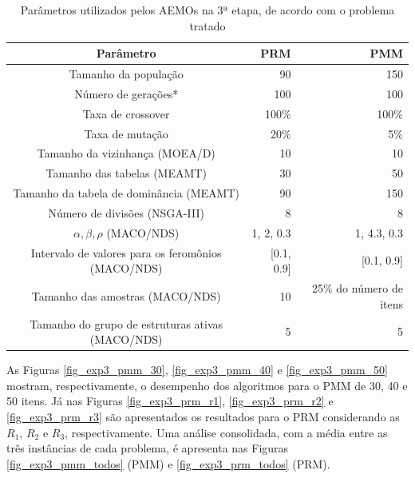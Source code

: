 \begin{table}[!htbp]
	\caption{Parâmetros utilizados pelos AEMOs na 3ª etapa, de acordo com o problema tratado}
	\label{table_exp3_parametros}
	\begin{center}
		\begin{tabular}{c|r|r}
			\textbf{Parâmetro} & \textbf{PRM} &  \textbf{PMM} \\ %
			\hline
			Tamanho da população               &    90 &      150 \\ %
			Número de gerações*        &   100 &      100 \\ %
			Taxa de crossover                & 100\% &    100\% \\ %
			Taxa de mutação                 &  20\% &      5\% \\ %
			Tamanho da vizinhança (MOEA/D)    &    10 &       10 \\ %
			Tamanho das tabelas (MEAMT)   &    30 &       50 \\ %
			Tamanho da tabela de dominância (MEAMT) &    90 &      150 \\ %
			Número de divisões (NSGA-III)&     8 &        8 \\ %
			$\alpha, \beta, \rho$ (MACO/NDS)& 1, 2, 0.3 & 1, 4.3, 0.3 \\ %
			Intervalo de valores para os feromônios (MACO/NDS)& [0.1, 0.9] & [0.1, 0.9] \\ %
			Tamanho das amostras (MACO/NDS)& 10 &25\% do número de itens \\  %
			Tamanho do grupo de estruturas ativas (MACO/NDS)& 5 & 5 \\
			\hline
		\end{tabular}
	\end{center}
\end{table}

As Figuras \ref{fig_exp3_pmm_30}, \ref{fig_exp3_pmm_40} e \ref{fig_exp3_pmm_50} mostram, respectivamente, o desempenho dos algoritmos para o PMM de 30, 40 e 50 itens. Já nas Figuras \ref{fig_exp3_prm_r1}, \ref{fig_exp3_prm_r2} e \ref{fig_exp3_prm_r3} são apresentados os resultados para o PRM considerando as $R_1$, $R_2$ e $R_3$, respectivamente. Uma análise consolidada, com a média entre as três instâncias de cada problema, é apresenta nas Figuras \ref{fig_exp3_pmm_todos} (PMM) e \ref{fig_exp3_prm_todos} (PRM).

